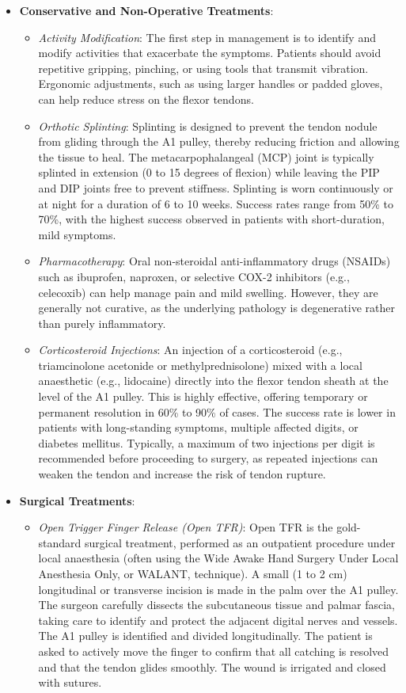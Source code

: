 \begin{itemize}
  \item \textbf{Conservative and Non-Operative Treatments}:
  \begin{itemize}
    \item \textit{Activity Modification}: The first step in management is to identify and modify activities that exacerbate the symptoms. Patients should avoid repetitive gripping, pinching, or using tools that transmit vibration. Ergonomic adjustments, such as using larger handles or padded gloves, can help reduce stress on the flexor tendons.
    \item \textit{Orthotic Splinting}: Splinting is designed to prevent the tendon nodule from gliding through the A1 pulley, thereby reducing friction and allowing the tissue to heal. The metacarpophalangeal (MCP) joint is typically splinted in extension (0 to 15 degrees of flexion) while leaving the PIP and DIP joints free to prevent stiffness. Splinting is worn continuously or at night for a duration of 6 to 10 weeks. Success rates range from 50\% to 70\%, with the highest success observed in patients with short-duration, mild symptoms.
    \item \textit{Pharmacotherapy}: Oral non-steroidal anti-inflammatory drugs (NSAIDs) such as ibuprofen, naproxen, or selective COX-2 inhibitors (e.g., celecoxib) can help manage pain and mild swelling. However, they are generally not curative, as the underlying pathology is degenerative rather than purely inflammatory.
    \item \textit{Corticosteroid Injections}: An injection of a corticosteroid (e.g., triamcinolone acetonide or methylprednisolone) mixed with a local anaesthetic (e.g., lidocaine) directly into the flexor tendon sheath at the level of the A1 pulley. This is highly effective, offering temporary or permanent resolution in 60\% to 90\% of cases. The success rate is lower in patients with long-standing symptoms, multiple affected digits, or diabetes mellitus. Typically, a maximum of two injections per digit is recommended before proceeding to surgery, as repeated injections can weaken the tendon and increase the risk of tendon rupture.
  \end{itemize}
  \item \textbf{Surgical Treatments}:
  \begin{itemize}
    \item \textit{Open Trigger Finger Release (Open TFR)}: Open TFR is the gold-standard surgical treatment, performed as an outpatient procedure under local anaesthesia (often using the Wide Awake Hand Surgery Under Local Anesthesia Only, or WALANT, technique). A small (1 to 2 cm) longitudinal or transverse incision is made in the palm over the A1 pulley. The surgeon carefully dissects the subcutaneous tissue and palmar fascia, taking care to identify and protect the adjacent digital nerves and vessels. The A1 pulley is identified and divided longitudinally. The patient is asked to actively move the finger to confirm that all catching is resolved and that the tendon glides smoothly. The wound is irrigated and closed with sutures.

\end{itemize}
\end{itemize}
